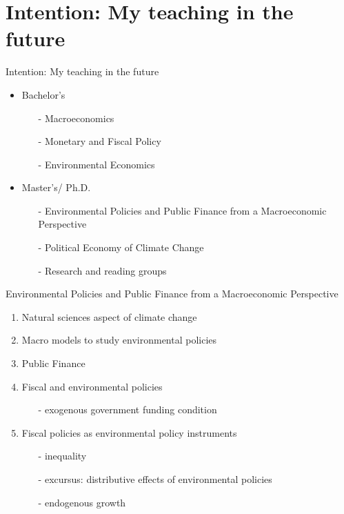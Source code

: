 \section*{Intention: My teaching in the future}
\begin{frame}{Intention: My teaching in the future}

\begin{itemize}
	\item Bachelor's
	\begin{itemize}
		\item[-] Macroeconomics
		\item[-] Monetary and Fiscal Policy
		\item[-] Environmental Economics 
	\end{itemize}
	\item Master's/ Ph.D.
	\begin{itemize}
		\item[-] Environmental Policies and Public Finance from a Macroeconomic Perspective
		\item[-] Political Economy of Climate Change
		\item[-] Research and reading groups
	\end{itemize}
\end{itemize}
\end{frame}

\begin{frame}{Environmental Policies and Public Finance from a Macroeconomic Perspective}
\begin{enumerate}
	\item Natural sciences aspect of climate change \footnotesize{\citep{Hassler2016EnvironmentalMacroeconomics, Hsiang2018AnScience}} \normalsize
	\item Macro models to study environmental policies \footnotesize{\citep{Acemoglu2012TheChange, Golosov2014OptimalEquilibrium, Acemoglu2016TransitionTechnology, Fried2018ClimateAnalysis}} \normalsize
	\item Public Finance \footnotesize{\citep{ Domeij2004OnTaxes, Conesa2009TaxingAll, Heathcote2017OptimalFramework}} \normalsize
	\item Fiscal and environmental policies
	\begin{itemize}
		\item[-] exogenous government funding condition \footnotesize{\citep{LansBovenberg1994EnvironmentalTaxation, Goulder1995EnvironmentalGuide, Barrage2019OptimalPolicy}}
	\end{itemize}
\item Fiscal policies as environmental policy instruments
\begin{itemize}
		\item[-] inequality \footnotesize{\citep{Jacobs2019RedistributionCurves, Dobkowitz2022, Douenne2022OptimalHouseholds}} \normalsize
		\item[-] excursus: distributive effects of environmental policies \footnotesize{\citep{Fried2018TheGenerations, Goulder2019IncomeGroups, Kotlikoff2021MakingWin}} \normalsize
		\item[-] endogenous growth
\end{itemize}
\end{enumerate}
\end{frame}

